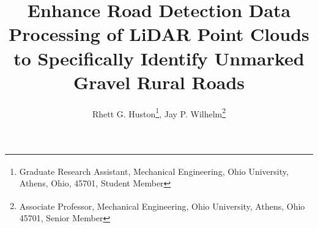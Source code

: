 \documentclass[journal,onecolumn]{IEEEtran}
\begin{document}
	\title{Enhance Road Detection Data Processing of LiDAR Point Clouds to Specifically Identify Unmarked Gravel Rural Roads}

	\author{Rhett G. Huston\textsuperscript{\textdagger}\thanks{\textsuperscript{\textdagger} Graduate Research Assistant, Mechanical Engineering, Ohio University, Athens, Ohio, 45701, Student Member}, Jay P. Wilhelm\textsuperscript{\textdaggerdbl}\thanks{\textsuperscript{\textdaggerdbl} Associate Professor, Mechanical Engineering, Ohio University, Athens, Ohio 45701, Senior Member}}

	
	
	

\end{document}
